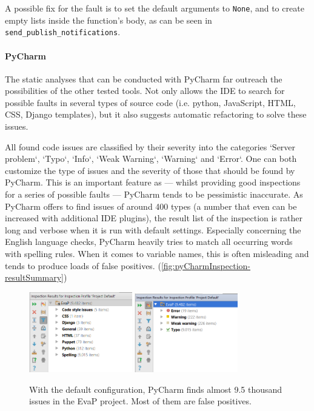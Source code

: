 A possible fix for the fault is to set the default arguments to \texttt{None}, and to create empty lists inside the function's body, as can be seen in \texttt{send\_publish\_notifications}.

\paragraph{PyCharm}
The static analyses that can be conducted with PyCharm far outreach the possibilities of the other tested tools.
Not only allows the IDE to search for possible faults in several types of source code (i.e. python, JavaScript, HTML, CSS, Django templates), but it also suggests automatic refactoring to solve these issues.

All found code issues are classified by their severity into the categories `Server problem`, `Typo`, `Info`, `Weak Warning`, `Warning` and `Error`.
One can both customize the type of issues and the severity of those that should be found by PyCharm.
This is an important feature as --- whilst providing good inspections for a series of possible faults --- PyCharm tends to be pessimistic inaccurate.
As PyCharm offers to find issues of around 400 types (a number that even can be increased with additional IDE plugins), the result list of the inspection is rather long and verbose when it is run with default settings.
Especially concerning the English language checks, PyCharm heavily tries to match all occurring words with spelling rules.
When it comes to variable names, this is often misleading and tends to produce loads of false positives. (\autoref{fig:pyCharmInspection-resultSummary})

\begin{figure}[h]
	\centering
	\includegraphics[width=0.4\textwidth]{graphics/pyCharmInspection-resultSummary}
	\includegraphics[width=0.4\textwidth]{graphics/pyCharmInspection-resultSummaryClassification}
	\caption{With the default configuration, PyCharm finds almost 9.5 thousand issues in the EvaP project. Most of them are false positives.}
	\label{fig:pyCharmInspection-resultSummary}
\end{figure}

